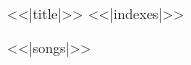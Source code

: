 \documentclass[a5paper,10pt]{book}
\begin{document}
<<|title|>>
<<|indexes|>>
\begin{songs}{}
<<|songs|>>
\end{songs}
\end{document}
